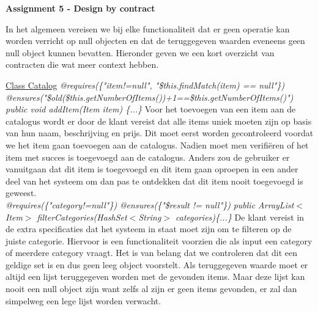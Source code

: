 \documentclass{article}
\begin{document}
\newpage
\maketitle
\noindent
\textbf{Assignment 5 - Design by contract} \newline
\newline

\maketitle
\noindent
In het algemeen vereisen we bij elke functionaliteit dat er geen operatie kan worden verricht op null objecten en dat de teruggegeven waarden eveneens geen null object kunnen bevatten. Hieronder geven we een kort overzicht van contracten die wat meer context hebben.\newline
\newline

\noindent
\underline{Class Catalog}\newline
\textit{@requires(\{"item!=null", "\$this.findMatch(item) == null"\})}\newline
\textit{@ensures("\$old(\$this.getNumberOfItems())+1==\$this.getNumberOfItems()")}\newline
\textit{public void addItem(Item item) \{...\}}\newline
Voor het toevoegen van een item aan de catalogus wordt er door de klant vereist dat alle items uniek moeten zijn op basis van hun naam, beschrijving en prijs. Dit moet eerst worden gecontroleerd voordat we het item gaan toevoegen aan de catalogus. Nadien moet men verifi\"{e}ren of het item met succes is toegevoegd aan de catalogus. Anders zou de gebruiker er vanuitgaan dat dit item is toegevoegd en dit item gaan oproepen in een ander deel van het systeem om dan pas te ontdekken dat dit item nooit toegevoegd is geweest.\\

\noindent
\textit{@requires(\{"category!=null"\})}\newline
\textit{@ensures(\{"\$result != null"\})}\newline
\textit{public ArrayList$<$Item$>$ filterCategories(HashSet$<$String$>$ categories)\{...\}}\newline
De klant vereist in de extra specificaties dat het systeem in staat moet zijn om te filteren op de juiste categorie. Hiervoor is een functionaliteit voorzien die als input een category of meerdere category vraagt. Het is van belang dat we controleren dat dit een geldige set is en dus geen leeg object voorstelt. Als teruggegeven waarde moet er altijd een lijst teruggegeven worden met de gevonden items. Maar deze lijst kan nooit een null object zijn want zelfs al zijn er geen items gevonden, er zal dan simpelweg een lege lijst worden verwacht. \\
\end{document}
